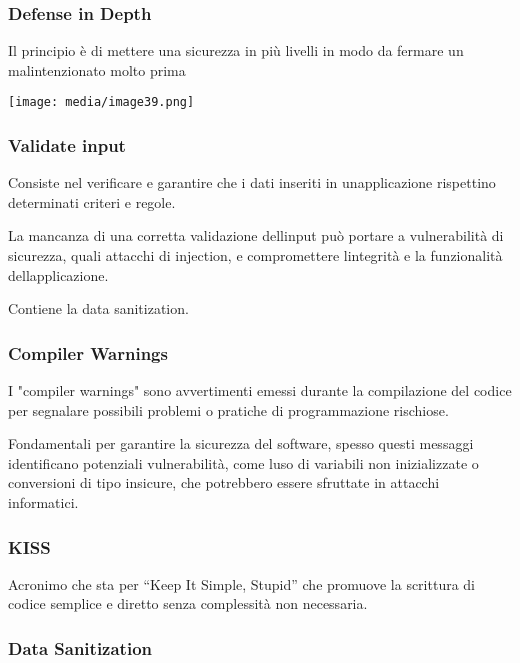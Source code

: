\subsubsection{Defense in Depth}\label{defense-in-depth}

Il principio è di mettere una sicurezza in più livelli in modo da
fermare un malintenzionato molto prima

\texttt{[image: media/image39.png]}

\subsubsection{Validate input}\label{validate-input}

Consiste nel verificare e garantire che i dati inseriti in
un\textquotesingle applicazione rispettino determinati criteri e regole.

La mancanza di una corretta validazione dell\textquotesingle input può
portare a vulnerabilità di sicurezza, quali attacchi di injection, e
compromettere l\textquotesingle integrità e la funzionalità
dell\textquotesingle applicazione.

Contiene la data sanitization.

\subsubsection{Compiler Warnings}\label{compiler-warnings}

I "compiler warnings" sono avvertimenti emessi durante la compilazione
del codice per segnalare possibili problemi o pratiche di programmazione
rischiose.

Fondamentali per garantire la sicurezza del software, spesso questi
messaggi identificano potenziali vulnerabilità, come
l\textquotesingle uso di variabili non inizializzate o conversioni di
tipo insicure, che potrebbero essere sfruttate in attacchi informatici.

\subsubsection{KISS}\label{kiss}

Acronimo che sta per ``Keep It Simple, Stupid'' che promuove la
scrittura di codice semplice e diretto senza complessità non necessaria.

\subsubsection{Data Sanitization}\label{data-sanitization}

